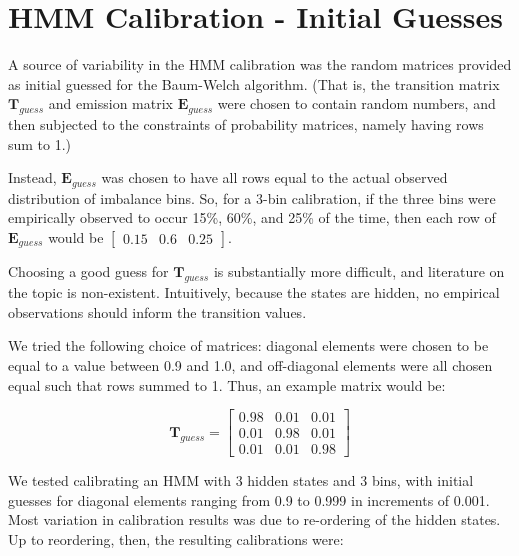 \documentclass[12pt]{article}
\newcommand\mat[1]{\boldsymbol{#1}}
\begin{document}
\section*{HMM Calibration - Initial Guesses}
A source of variability in the HMM calibration was the random matrices provided as initial guessed for the Baum-Welch algorithm. (That is, the transition matrix $\mat{T}_{guess}$ and emission matrix $\mat{E}_{guess}$ were chosen to contain random numbers, and then subjected to the constraints of probability matrices, namely having rows sum to 1.) 

Instead,  $\mat{E}_{guess}$ was chosen to have all rows equal to the actual observed distribution of imbalance bins. So, for a 3-bin calibration, if the three bins were empirically observed to occur 15\%, 60\%, and 25\% of the time, then each row of $\mat{E}_{guess}$ would be $[ \begin{smallmatrix} 0.15 & 0.6 & 0.25 \end{smallmatrix} ]$.

Choosing a good guess for $\mat{T}_{guess}$ is substantially more difficult, and literature on the topic is non-existent. Intuitively, because the states are hidden, no empirical observations should inform the transition values. 

We tried the following choice of matrices: diagonal elements were chosen to be equal to a value between 0.9 and 1.0, and off-diagonal elements were all chosen equal such that rows summed to 1. Thus, an example matrix would be:

$$\mat{T}_{guess} = \begin{bmatrix} 0.98 & 0.01 & 0.01 \\ 0.01 & 0.98 & 0.01 \\ 0.01 & 0.01 &  0.98 \end{bmatrix}$$

We tested calibrating an HMM with 3 hidden states and 3 bins, with initial guesses for diagonal elements ranging from 0.9 to 0.999 in increments of 0.001. Most variation in calibration results was due to re-ordering of the hidden states. Up to reordering, then, the resulting calibrations were:
\end{document}
